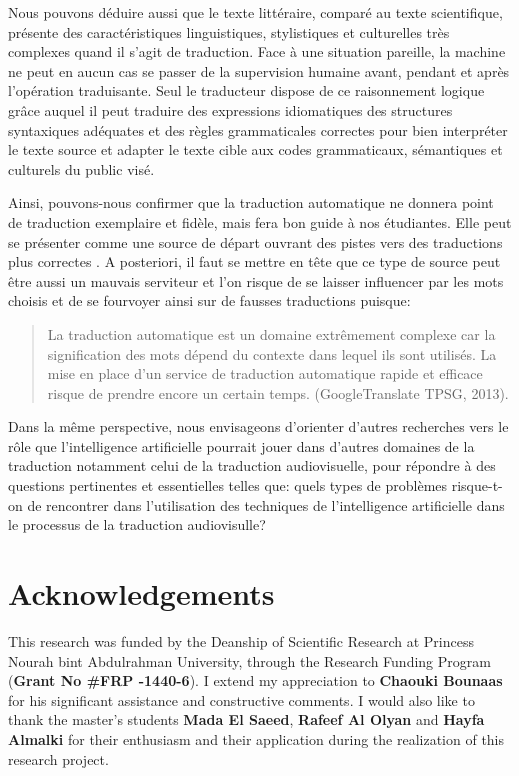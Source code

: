 \documentclass{textolivre}
\begin{document}
Nous pouvons déduire aussi que le texte littéraire, comparé au texte scientifique, présente des caractéristiques linguistiques, stylistiques et culturelles très complexes quand il s’agit de traduction. Face à une situation pareille, la machine ne peut en aucun cas se passer de la supervision humaine avant, pendant et après l’opération traduisante. Seul le traducteur dispose de ce raisonnement logique grâce auquel il peut traduire des expressions idiomatiques des structures syntaxiques adéquates et des règles grammaticales correctes pour bien interpréter le texte source et adapter le texte cible aux codes grammaticaux, sémantiques et culturels du public visé.

Ainsi, pouvons-nous confirmer que la traduction automatique ne donnera point de traduction exemplaire et fidèle, mais fera bon guide à nos étudiantes. Elle peut se présenter comme une source de départ ouvrant des pistes vers des traductions plus correctes \cite{gile2005}.  A posteriori, il faut se mettre en tête que ce type de source peut être aussi un mauvais serviteur et l’on risque de se laisser influencer par les mots choisis et de se fourvoyer ainsi sur de fausses traductions \cite[p. 214]{aubin1995} puisque:
 
\begin{quote}La traduction automatique est un domaine extrêmement complexe car la signification des mots dépend du contexte dans lequel ils sont utilisés. La mise en place d’un service de traduction automatique rapide et efficace risque de prendre encore un certain temps. (GoogleTranslate TPSG, 2013).
\end{quote}

Dans la même perspective, nous envisageons d’orienter d’autres recherches vers le rôle que l’intelligence artificielle pourrait jouer dans d’autres domaines de la traduction notamment celui de la traduction audiovisuelle, pour répondre à des questions pertinentes et essentielles telles que: quels types de problèmes risque-t-on de rencontrer dans l’utilisation des techniques de l’intelligence artificielle dans le processus de la traduction audiovisulle?

\section{Acknowledgements}\label{sec-agradecimentos}
This research was funded by the Deanship of Scientific Research at Princess Nourah bint Abdulrahman University, through the Research Funding Program (\textbf{Grant No \#FRP -1440-6}).
I extend my appreciation to \textbf{Chaouki Bounaas} for his significant assistance and constructive comments. I would also like to thank the master's students \textbf{Mada El Saeed}, \textbf{Rafeef Al Olyan} and \textbf{Hayfa Almalki} for their enthusiasm and their application during the realization of this research project.

\printbibliography\label{sec-bib}
\end{document}
